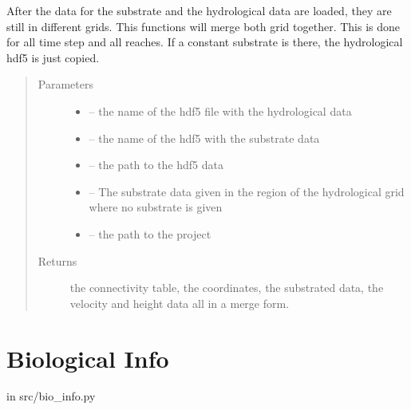 \documentclass[letterpaper,10pt,english]{sphinxmanual}
\begin{document}

\begin{fulllineitems}
\label{\detokenize{index:src.mesh_grid2.merge_grid_hydro_sub}}
After the data for the substrate and the hydrological data are loaded, they are still in different grids.
This functions will merge both grid together. This is done for all time step and all reaches. If a
constant substrate is there, the hydrological hdf5 is just copied.
\begin{quote}\begin{description}
\item[{Parameters}] \leavevmode\begin{itemize}
\item {} 
 -- the name of the hdf5 file with the hydrological data

\item {} 
 -- the name of the hdf5 with the substrate data

\item {} 
 -- the path to the hdf5 data

\item {} 
 -- The substrate data given in the region of the hydrological grid where no substrate is given

\item {} 
 -- the path to the project

\end{itemize}

\item[{Returns}] \leavevmode
the connectivity table, the coordinates, the substrated data, the velocity and height data all in a merge form.

\end{description}\end{quote}

\end{fulllineitems}



\section{Biological Info}
\label{\detokenize{index:biological-info}}
in src/bio\_info.py
\end{document}
